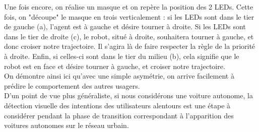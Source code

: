 \begin{itemize}
					Une fois encore, on réalise un masque et on repère la position des 2 LEDs. Cette fois, on "découpe" le masque en trois verticalement : si les LEDs sont dans le tier de gauche (a), l'agent est à gauche et désire tourner à droite. Si les LEDs sont dans le tier de droite (c), le robot, situé à droite, souhaitera tourner à gauche, et donc croiser notre trajectoire. Il s'agira là de faire respecter la règle de la priorité à droite. Enfin, si celles-ci sont dans le tier du milieu (b), cela signifie que le robot est en face et désire tourner à gauche, et croiser notre trajectoire.
					\\
					On démontre ainsi ici qu'avec une simple asymétrie, on arrive facilement à prédire le comportement des autres usagers.
					\\
					D'un point de vue plus généraliste, si nous considérons une voiture autonome, la détection visuelle des intentions des utilisateurs alentours est une étape à considérer pendant la phase de transition correspondant à l'apparition des voitures autonomes sur le réseau urbain.
			\end{itemize}